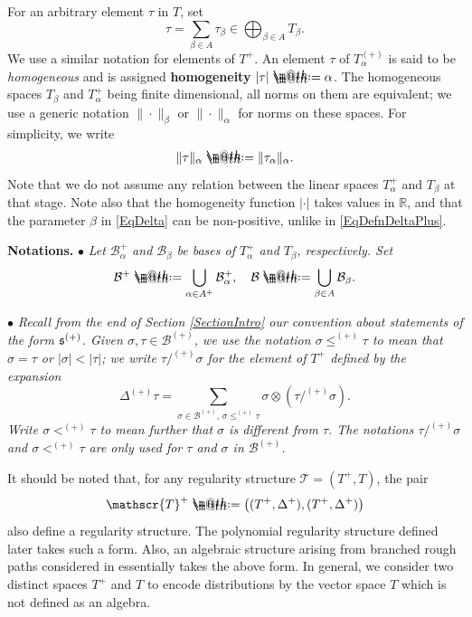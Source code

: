 \documentclass[10pt, reqno]{amsart}
\makeatletter
\numberwithin{subsection}{section}
\numberwithin{subsubsection}{subsection}
\numberwithin{equation}{section} %
\theoremstyle{mystyle}
\theoremstyle{mystyle2}
\theoremstyle{mystyle3}
\newcommand\bbR{\mathbb{R}}
\newcommand{\mcB}{\mathcal{B}}
\newcommand*{\defeq}{\mathrel{\rlap{%
                     \raisebox{0.3ex}{$\m@th\cdot$}}%
                     \raisebox{-0.3ex}{$\m@th\cdot$}}%
                     =}
\makeatother
\begin{document}
For an arbitrary element $\tau$ in $T$, set
\begin{equation*}
\tau = \sum_{\beta\in A} \tau_\beta \in \bigoplus_{\beta\in A} T_\beta.
\end{equation*}
We use a similar notation for elements of $T^+$. An element $\tau$ of $T_\alpha^{(+)}$ is said to be \emph{homogeneous} and is assigned \textsf{\textbf{homogeneity}} $|\tau| \defeq  \alpha$. The homogeneous spaces $T_{\beta}$ and $T^{+}_\alpha$ being finite dimensional, all norms on them are equivalent; we use a generic notation $\|\cdot\|_\beta$ or $\|\cdot\|_\alpha$ for norms on these spaces. For simplicity, we write
\begin{align}
\label{EqNotationDirectSum}
\|\tau\|_\alpha \defeq \|\tau_\alpha\|_\alpha.
\end{align}
Note that we do not assume any relation between the linear spaces $T_\alpha^+$ and $T_\beta$ at that stage. Note also that the homogeneity function $\vert\cdot\vert$ takes values in $\bbR$, and that the parameter $\beta$ in \eqref{EqDelta} can be non-positive, unlike in \eqref{EqDefnDeltaPlus}.

\medskip

\noindent \textbf{\textsf{Notations.}} $\bullet$ {\it Let $\mcB_\alpha^+$ 
 and $\mcB_\beta$ be bases of $T_\alpha^+$ and $T_\beta$, respectively. Set 
$$
\mcB^+ \defeq  \bigcup_{\alpha\in A^+} \mcB_\alpha^+, \quad \mcB \defeq  \bigcup_{\beta\in A} \mcB_\beta.
$$   }\vspace{0.15cm}

$\bullet$ \textit{Recall from the end of Section \ref{SectionIntro} our convention about statements of the form $\frak{s}^{(+)}$. Given $\sigma, \tau \in \mcB^{(+)}$, we use the notation $\sigma\leq^{(+)}\tau$ to mean that 
$\sigma=\tau$ or $|\sigma|<|\tau|$; we write $\tau/^{(+)}\sigma$ for 
the element of $T^+$ defined by the expansion
\begin{equation}\label{EqCoprodQuotient}
\Delta^{(+)}\tau = \sum_{\sigma\in\mcB^{(+)},\, \sigma\le^{(+)}\tau } \sigma\otimes (\tau/^{(+)}\sigma).
\end{equation}
Write $\sigma<^{(+)}\tau$ to mean further that $\sigma$ is different from 
$\tau$. The notations $\tau/^{(+)}\sigma$ and $\sigma<^{(+)}\tau$ are only used for $\tau$ and $\sigma$ in $\mcB^{(+)}$.}

\bigskip

It should be noted that, for any regularity structure $\mathscr{T}=(T^+,T)$, the pair
$$
\mathscr{T}^+ \defeq  \big((T^+,\Delta^+),(T^+,\Delta^+)\big)
$$ 
also define a regularity structure. The polynomial regularity structure defined later takes such a form. Also, an algebraic structure arising from branched rough paths considered in \cite{GubinelliBranched} essentially takes the above form. In general, we consider two distinct spaces $T^+$ and $T$ to encode distributions by the vector space $T$ which is not defined as an algebra.
\end{document}
